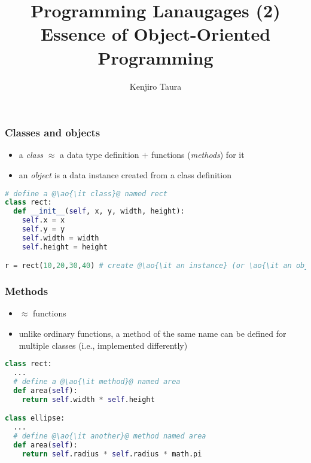 \documentclass[12pt,dvipdfmx]{beamer}
\title{Programming Lanaugages (2) \\
Essence of Object-Oriented Programming}
\institute{}
\author{Kenjiro Taura}
\date{}
\newcommand{\ao}[1]{{\color{blue}#1}}
\begin{document}
\maketitle


\begin{frame}[fragile]
  \frametitle{Classes and objects}

  \begin{itemize}
  \item a \ao{\it class} $\approx$ a data type definition $+$
    functions (\ao{\it methods}) for it
  \item an \ao{\it object} is a data instance created from a class definition
  \end{itemize}

  \begin{center}
\begin{lstlisting}[language=python]
# define a @\ao{\it class}@ named rect
class rect:
  def __init__(self, x, y, width, height):
    self.x = x
    self.y = y
    self.width = width
    self.height = height

r = rect(10,20,30,40) # create @\ao{\it an instance} (or \ao{\it an object}) of rect@
\end{lstlisting}
  \end{center}
\end{frame}

\begin{frame}[fragile]
  \frametitle{Methods}
  \begin{itemize}
  \item $\approx$ functions
  \item unlike ordinary functions, a method of the same name can be defined
    for multiple classes (i.e., implemented differently)
  \end{itemize}

  \begin{center}
\begin{lstlisting}[language=python]
class rect:
  ...
  # define a @\ao{\it method}@ named area
  def area(self):
    return self.width * self.height

class ellipse:
  ...
  # define @\ao{\it another}@ method named area
  def area(self):
    return self.radius * self.radius * math.pi
  \end{lstlisting}
\end{center}
\end{frame}
\end{document}
